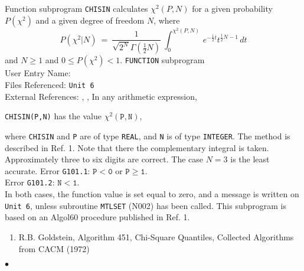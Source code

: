                        
                
\Submitter{}                      
            
Function subprogram {\tt CHISIN} calculates $\chi^2(P,N)$ for a given
probability $P(\chi^2)$ and a given degree of freedom $N$, where
$$P(\chi^2|N) \ = \
\frac{1}{\sqrt{2^N}\Gamma(\textstyle \frac{1}{2}N)} \
\int_0^{\chi^2(P,N)}\,e^{-\frac{1}{2}t}t^{\frac{1}{2}N-1}\, dt $$
and $N \geq 1$ and $0 \leq P(\chi^2) < 1$.
\Structure
{\tt FUNCTION} subprogram \\
User Entry Name:  \\
Files Referenced: {\tt Unit 6} \\
External References: ,
\Rind{MTLMTR}{N002}, 
\Usage
In any arithmetic expression,
\begin{center}
{\tt CHISIN(P,N)} \quad has the value \quad $\chi^2(\mathtt{P,N})$,
\end{center}
where {\tt CHISIN} and {\tt P} are of type
{\tt REAL}, and {\tt N} is of type {\tt INTEGER}.
\Method
The method is described in Ref. 1. Note that there the complementary
integral is taken.
\Accuracy
Approximately three to six digits are correct. The case $N = 3$
is the least accurate.
\Errorh
Error {\tt G101.1}: $\mathtt{P<0}$ or $\mathtt{P \ge 1}$. \\
Error {\tt G101.2}: $\mathtt{N<1}$. \\
In both cases,
the function value is set equal to zero, and a message is written on
{\tt Unit 6}, unless subroutine {\tt MTLSET} (N002) has been called.
\Source
This subprogram is based on an Algol60 procedure published in Ref. 1.
\Refer
\begin{enumerate}
\item R.B. Goldstein, Algorithm 451, Chi-Square Quantiles, Collected
Algorithms from CACM (1972)
\end{enumerate}
$\bullet$
